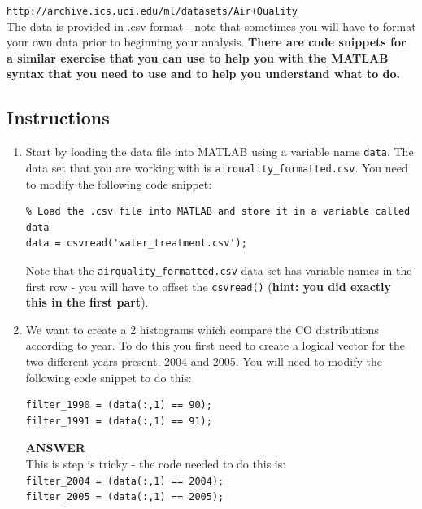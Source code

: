\documentclass[12pt]{article}
\begin{document}
\verb|http://archive.ics.uci.edu/ml/datasets/Air+Quality|\\

The data is provided in .csv format - note that sometimes you will have to format your own data prior to beginning your analysis. \textbf{There are code snippets for a similar exercise that you can use to help you with the MATLAB syntax that you need to use and to help you understand what to do.}

\subsection*{Instructions}
\begin{enumerate}
\item Start by loading the data file into MATLAB using a variable name \verb|data|. The data set that you are working with is \verb|airquality_formatted.csv|. You need to modify the following code snippet:
\vspace{-0.4cm}
\begin{lstlisting}
% Load the .csv file into MATLAB and store it in a variable called data
data = csvread('water_treatment.csv');
\end{lstlisting}
Note that the \verb|airquality_formatted.csv| data set has variable names in the first row - you will have to offset the \verb|csvread()| (\textbf{hint: you did exactly this in the first part}).

\item We want to create a 2 histograms which compare the CO distributions according to year. To do this you first need to create a logical vector for the two different years present, 2004 and 2005. You will need to modify the following code snippet to do this:
\vspace{-0.8cm}
\begin{lstlisting}
filter_1990 = (data(:,1) == 90);
filter_1991 = (data(:,1) == 91);
\end{lstlisting}

\begin{tcolorbox}
\textbf{ANSWER}\\

\vspace{-0.3cm}
This is step is tricky - the code needed to do this is:\\
\verb|filter_2004 = (data(:,1) == 2004);|\\
\verb|filter_2005 = (data(:,1) == 2005);|
\end{tcolorbox}


\end{enumerate}
\end{document}
